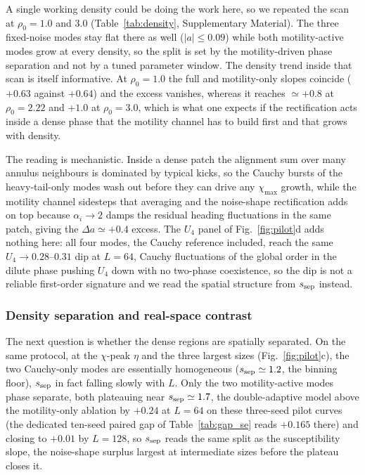 \documentclass[11pt,a4paper]{article}
\begin{document}
A single working density could be doing the work here, so we
repeated the scan at $\rho_0 = 1.0$ and $3.0$
(Table~\ref{tab:density}, Supplementary Material). The three
fixed-noise modes stay flat there as well ($|a| \le 0.09$) while
both motility-active modes grow at every density, so the split is
set by the motility-driven phase separation and not by a tuned
parameter window. The density trend inside that scan is itself
informative. At $\rho_0 = 1.0$ the full and motility-only slopes
coincide ($+0.63$ against $+0.64$) and the excess vanishes,
whereas it reaches $\simeq +0.8$ at $\rho_0 = 2.22$ and $+1.0$ at
$\rho_0 = 3.0$, which is what one expects if the rectification
acts inside a dense phase that the motility channel has to build
first and that grows with density.

The reading is mechanistic. Inside a dense patch the alignment
sum over many annulus neighbours is dominated by typical kicks,
so the Cauchy bursts of the heavy-tail-only modes wash out
before they can drive any $\chi_{\max}$ growth, while the motility
channel sidesteps that averaging and the noise-shape rectification
adds on top because $\alpha_i \to 2$ damps the residual heading
fluctuations in the same patch, giving the $\Delta a \simeq +0.4$
excess. The $U_4$
panel of Fig.~\ref{fig:pilot}d adds nothing here: all four modes,
the Cauchy reference included, reach the same $U_4 \to
0.28$--$0.31$ dip at $L = 64$, Cauchy fluctuations of the global
order in the dilute phase pushing $U_4$ down with no two-phase
coexistence, so the dip is not a reliable first-order signature
and we read the spatial structure from $s_{\rm sep}$ instead.

\subsubsection{Density separation and real-space contrast}

The next question is whether the dense regions are spatially
separated. On the same protocol, at the $\chi$-peak $\eta$ and
the three largest sizes (Fig.~\ref{fig:pilot}c), the two
Cauchy-only modes are essentially homogeneous ($s_{\rm sep}
\simeq 1.2$, the binning floor), $s_{\rm sep}$ in fact
falling slowly with $L$. Only the two motility-active modes
phase separate, both plateauing near $s_{\rm sep} \simeq 1.7$,
the double-adaptive model above the motility-only ablation by
$+0.24$ at $L = 64$ on these three-seed pilot curves (the
dedicated ten-seed paired gap of Table~\ref{tab:gap_se} reads
$+0.165$ there) and closing to $+0.01$ by $L = 128$, so
$s_{\rm sep}$ reads the same split as the susceptibility slope,
the noise-shape surplus largest at intermediate sizes before
the plateau closes it.
\end{document}
